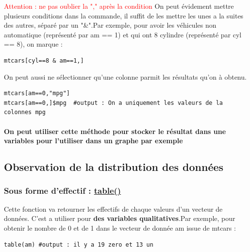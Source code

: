 \documentclass{article}
\newcommand{\warning}[1]{\textcolor{red}{#1}}
\begin{document}
\warning{Attention : ne pas oublier la "," après la condition}
\newline \newline
On peut évidement mettre plusieurs conditions dans la commande, il suffit de les mettre les unes a la suites des autres, séparé par un "\&".\newline Par exemple, pour avoir les véhicules non automatique (représenté par am == 1) et qui ont 8 cylindre (représenté par cyl == 8), on marque : 
\begin{verbatim}
mtcars[cyl==8 & am==1,]
\end{verbatim}

On peut aussi ne sélectionner qu'une colonne parmit les résultats qu'on à obtenu.
\begin{verbatim}
mtcars[am==0,"mpg"]
mtcars[am==0,]$mpg  #output : On a uniquement les valeurs de la colonnes mpg

\end{verbatim}
\paragraph{On peut utiliser cette méthode pour stocker le résultat dans une variables pour l'utiliser dans un graphe par exemple}

\subsection{Observation de la distribution des données}
\subsubsection{Sous forme d'effectif : \href{https://www.rdocumentation.org/packages/base/versions/3.6.2/topics/table}{table()} }
Cette fonction va retourner les effectifs de chaque valeurs d'un vecteur de données. C'est a utiliser pour \textbf{des variables qualitatives}.\newline Par exemple, pour obtenir le nombre de 0 et de 1 dans le vecteur de donnée am issue de mtcars : 
\begin{verbatim}
table(am) #output : il y a 19 zero et 13 un
\end{verbatim}
\end{document}
